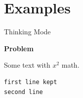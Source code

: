 \documentclass{article}
\newcommand{\FieldHeader}[1]{\par\smallskip\noindent\textbf{#1}\par\smallskip}
\begin{document}
\section{Examples}
\begin{InteractionBox}{Thinking Mode}
\FieldHeader{Problem}
\end{InteractionBox}

\begin{tcolorbox}[title=Plain box]
Some text with $x^2$ math.
\end{tcolorbox}

\begin{lstlisting}
first line kept
second line
\end{lstlisting}
\end{document}
